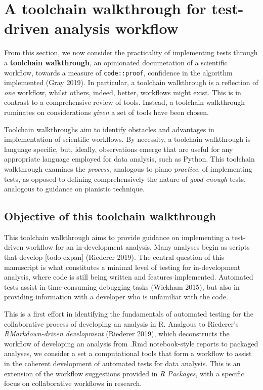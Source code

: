 \documentclass[
]{article}
\begin{document}
\hypertarget{a-toolchain-walkthrough-for-test-driven-analysis-workflow}{%
\section{A toolchain walkthrough for test-driven analysis
workflow}\label{a-toolchain-walkthrough-for-test-driven-analysis-workflow}}

From this section, we now consider the practicality of implementing
tests through a \textbf{toolchain walkthrough}, an opinionated
documetation of a scientific workflow, towards a measure of
\texttt{code::proof}, confidence in the algorithm implemented (Gray
2019). In particular, a toolchain walkthrough is a reflection of
\emph{one} workflow, whilst others, indeed, better, workflows might
exist. This is in contrast to a comprehensive review of tools. Instead,
a toolchain walkthrough ruminates on considerations \emph{given} a set
of tools have been chosen.

Toolchain walkthroughs aim to identify obstacles and advantages in
implementation of scientific workflows. By necessity, a toolchain
walkthrough is language specific, but, ideally, observations emerge that
are useful for any appropriate language employed for data analysis, such
as Python. This toolchain walkthrough examines the \emph{process},
analogous to piano \emph{practice}, of implementing tests, as opposed to
defining comprehensively the nature of \emph{good enough} tests,
analogous to guidance on pianistic technique.

\hypertarget{objective-of-this-toolchain-walkthrough}{%
\subsection{Objective of this toolchain
walkthrough}\label{objective-of-this-toolchain-walkthrough}}

This toolchain walkthrough aims to provide guidance on implementing a
test-driven workflow for an in-development analysis. Many analyses begin
as scripts that develop {[}todo expan{]} (Riederer 2019). The central
question of this manuscript is what constitutes a minimal level of
testing for in-development analysis, where code is still being written
and features implemented. Automated tests assist in time-consuming
debugging tasks (Wickham 2015), but also in providing information with a
developer who is unfamiliar with the code.

This is a first effort in identifying the fundamentals of automated
testing for the collaborative process of developing an analysis in R.
Analgous to Riederer's \emph{RMarkdown-driven development} (Riederer
2019), which deconstructs the workflow of developing an analysis from
.Rmd notebook-style reports to packaged analyses, we consider a set a
computational tools that form a workflow to assist in the coherent
development of automated tests for data analysis. This is an extension
of the workflow suggestions provided in \emph{R Packages}, with a
specific focus on collaborative workflows in research.
\end{document}
